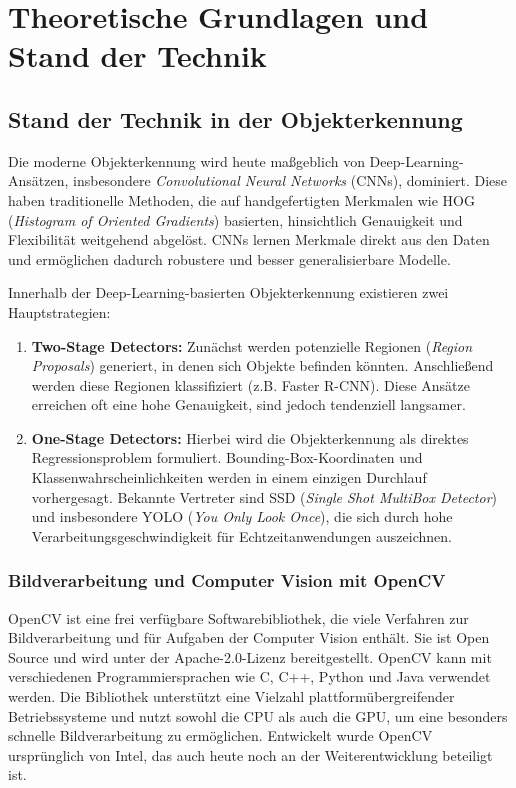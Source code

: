 \section{Theoretische Grundlagen und Stand der Technik}

\subsection{Stand der Technik in der Objekterkennung}

Die moderne Objekterkennung wird heute maßgeblich von Deep-Learning-Ansätzen, insbesondere \textit{Convolutional Neural Networks} (CNNs), dominiert. Diese haben traditionelle Methoden, die auf handgefertigten Merkmalen wie HOG (\textit{Histogram of Oriented Gradients}) basierten, hinsichtlich Genauigkeit und Flexibilität weitgehend abgelöst. CNNs lernen Merkmale direkt aus den Daten und ermöglichen dadurch robustere und besser generalisierbare Modelle.

Innerhalb der Deep-Learning-basierten Objekterkennung existieren zwei Hauptstrategien:

\begin{enumerate}
    \item \textbf{Two-Stage Detectors:} Zunächst werden potenzielle Regionen (\textit{Region Proposals}) generiert, in denen sich Objekte befinden könnten. Anschließend werden diese Regionen klassifiziert (z.B. Faster R-CNN). Diese Ansätze erreichen oft eine hohe Genauigkeit, sind jedoch tendenziell langsamer.
    \item \textbf{One-Stage Detectors:} Hierbei wird die Objekterkennung als direktes Regressionsproblem formuliert. Bounding-Box-Koordinaten und Klassenwahrscheinlichkeiten werden in einem einzigen Durchlauf vorhergesagt. Bekannte Vertreter sind SSD (\textit{Single Shot MultiBox Detector}) und insbesondere YOLO (\textit{You Only Look Once}), die sich durch hohe Verarbeitungsgeschwindigkeit für Echtzeitanwendungen auszeichnen.
\end{enumerate}

\subsubsection{Bildverarbeitung und Computer Vision mit OpenCV}
OpenCV ist eine frei verfügbare Softwarebibliothek, die viele Verfahren zur Bildverarbeitung und für Aufgaben der Computer Vision enthält. Sie ist Open Source und wird unter der Apache-2.0-Lizenz bereitgestellt. OpenCV kann mit verschiedenen Programmiersprachen wie C, C++, Python und Java verwendet werden. Die Bibliothek unterstützt eine Vielzahl plattformübergreifender Betriebssysteme und nutzt sowohl die CPU als auch die GPU, um eine besonders schnelle Bildverarbeitung zu ermöglichen. Entwickelt wurde OpenCV ursprünglich von Intel, das auch heute noch an der Weiterentwicklung beteiligt ist.

